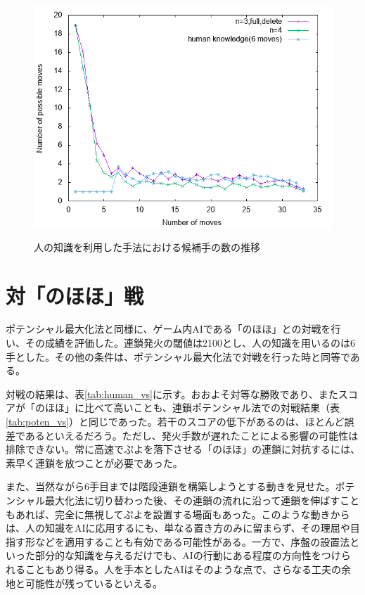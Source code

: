 \documentclass[12pt]{jarticle}
\begin{document}
\begin{figure}[hbt]
  \begin{center}
  \includegraphics[height=9cm]{experiment/HumanKnowledge/human_tsumoList.png}
  \caption{人の知識を利用した手法における候補手の数の推移} \label{fig:human_tsumoList}
\end{center}
\end{figure}


\section{対「のほほ」戦}
ポテンシャル最大化法と同様に、ゲーム内AIである「のほほ」との対戦を行い、その成績を評価した。連鎖発火の閾値は2100とし、人の知識を用いるのは6手とした。その他の条件は、ポテンシャル最大化法で対戦を行った時と同等である。

対戦の結果は、表\ref{tab:human_vs}に示す。おおよそ対等な勝敗であり、またスコアが「のほほ」に比べて高いことも、連鎖ポテンシャル法での対戦結果（表\ref{tab:poten_vs}）と同じであった。若干のスコアの低下があるのは、ほとんど誤差であるといえるだろう。ただし、発火手数が遅れたことによる影響の可能性は排除できない。常に高速でぷよを落下させる「のほほ」の連鎖に対抗するには、素早く連鎖を放つことが必要であった。

また、当然ながら6手目までは階段連鎖を構築しようとする動きを見せた。ポテンシャル最大化法に切り替わった後、その連鎖の流れに沿って連鎖を伸ばすこともあれば、完全に無視してぷよを設置する場面もあった。このような動きからは、人の知識をAIに応用するにも、単なる置き方のみに留まらず、その理屈や目指す形などを適用することも有効である可能性がある。一方で、序盤の設置法といった部分的な知識を与えるだけでも、AIの行動にある程度の方向性をつけられることもあり得る。人を手本としたAIはそのような点で、さらなる工夫の余地と可能性が残っているといえる。
\end{document}
